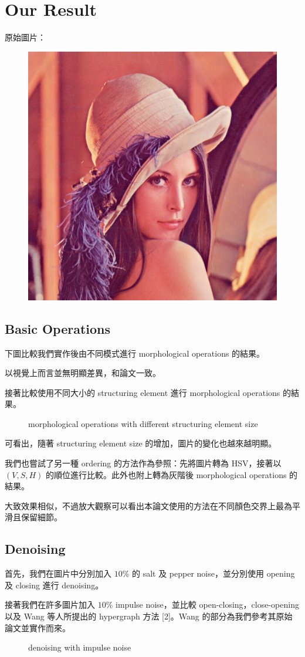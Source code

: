 \section*{Our Result}

原始圖片：
\begin{figure}[!ht]
    \centering
    \includegraphics[width=0.22\linewidth]{../images/samples/lena.png}
\end{figure}

\subsection*{Basic Operations}

下圖比較我們實作後由不同模式進行 morphological operations 的結果。

以視覺上而言並無明顯差異，和論文一致。

接著比較使用不同大小的 structuring element 進行 morphological operations 的結果。
\begin{figure}[!ht]
    \centering
    
    
    \caption{morphological operations with different structuring element size}
\end{figure}
可看出，隨著 structuring element size 的增加，圖片的變化也越來越明顯。

\clearpage
我們也嘗試了另一種 ordering 的方法作為參照：先將圖片轉為 HSV，接著以 $(V, S, H)$ 的順位進行比較。此外也附上轉為灰階後 morphological operations 的結果。



大致效果相似，不過放大觀察可以看出本論文使用的方法在不同顏色交界上最為平滑且保留細節。

\clearpage
\subsection*{Denoising}
首先，我們在圖片中分別加入 $10\%$ 的 salt 及 pepper noise，並分別使用 opening 及 closing 進行 denoising。

\clearpage
接著我們在許多圖片加入 $10\%$ impulse noise，並比較 open-closing，close-opening 以及 Wang 等人所提出的 hypergraph 方法 [2]。Wang 的部分為我們參考其原始論文並實作而來。
\begin{figure}[!ht]
    \centering
    
    
    
    
    \caption*{denoising with impulse noise}
\end{figure}

